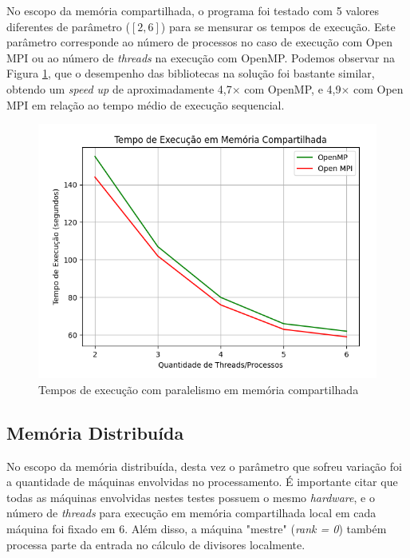 \documentclass[a4paper, 12pt]{article}
\begin{document}
No escopo da memória compartilhada, o programa foi testado com 5 valores diferentes de parâmetro (\([2, 6]\)) para se mensurar os tempos de execução. Este parâmetro corresponde ao número de processos no caso de execução com Open MPI ou ao número de \emph{threads} na execução com OpenMP. Podemos observar na Figura \ref{fig:map5}, que o desempenho das bibliotecas na solução foi bastante similar, obtendo um \emph{speed up} de aproximadamente 4,7\(\times\) com OpenMP, e 4,9\(\times\) com Open MPI em relação ao tempo médio de execução sequencial.

\begin{figure}[H]
    \centering
    \includegraphics[width=1\textwidth]{Images/shared.png}
    \vspace*{-0.8cm}
    \caption{Tempos de execução com paralelismo em memória compartilhada}
    \label{fig:map5}
\end{figure}

\subsection{Memória Distribuída}

No escopo da memória distribuída, desta vez o parâmetro que sofreu variação foi a quantidade de máquinas envolvidas no processamento. É importante citar que todas as máquinas envolvidas nestes testes possuem o mesmo \emph{hardware}, e o número de \emph{threads} para execução em memória compartilhada local em cada máquina foi fixado em 6. Além disso, a máquina "mestre" \hspace{0.1cm}(\textit{rank = 0}) também processa parte da entrada no cálculo de divisores localmente.
\end{document}
